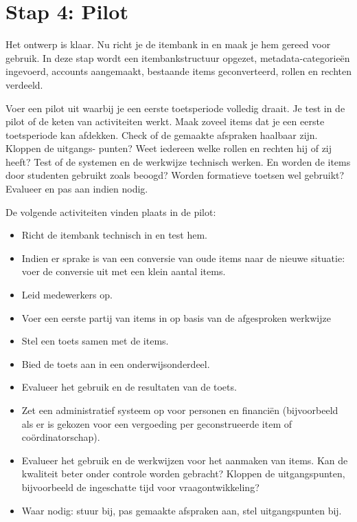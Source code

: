 \documentclass[
]{book}
\providecommand{\tightlist}{%
  \setlength{\itemsep}{0pt}\setlength{\parskip}{0pt}}
\begin{document}
\hypertarget{stap-4-pilot}{%
\section{Stap 4: Pilot}\label{stap-4-pilot}}

Het ontwerp is klaar. Nu richt je de itembank in en maak je hem gereed voor gebruik. In deze stap wordt een itembankstructuur opgezet, metadata-categorieën ingevoerd, accounts aangemaakt, bestaande items geconverteerd, rollen en rechten verdeeld.

Voer een pilot uit waarbij je een eerste toetsperiode volledig draait. Je test in de pilot of de keten van activiteiten werkt. Maak zoveel items dat je een eerste toetsperiode kan afdekken. Check of de gemaakte afspraken haalbaar zijn. Kloppen de uitgangs- punten? Weet iedereen welke rollen en rechten hij of zij heeft? Test of de systemen en de werkwijze technisch werken. En worden de items door studenten gebruikt zoals beoogd? Worden formatieve toetsen wel gebruikt? Evalueer en pas aan indien nodig.

De volgende activiteiten vinden plaats in de pilot:

\begin{itemize}
\tightlist
\item
  Richt de itembank technisch in en test hem.
\item
  Indien er sprake is van een conversie van oude items naar de nieuwe situatie: voer de conversie uit met een klein aantal items.
\item
  Leid medewerkers op.
\item
  Voer een eerste partij van items in op basis van de afgesproken werkwijze
\item
  Stel een toets samen met de items.
\item
  Bied de toets aan in een onderwijsonderdeel.
\item
  Evalueer het gebruik en de resultaten van de toets.
\item
  Zet een administratief systeem op voor personen en financiën (bijvoorbeeld als er is gekozen voor een vergoeding per geconstrueerde item of coördinatorschap).
\item
  Evalueer het gebruik en de werkwijzen voor het aanmaken van items. Kan de kwaliteit beter onder controle worden gebracht? Kloppen de uitgangspunten, bijvoorbeeld de ingeschatte tijd voor vraagontwikkeling?
\item
  Waar nodig: stuur bij, pas gemaakte afspraken aan, stel uitgangspunten bij.
\end{itemize}
\end{document}
